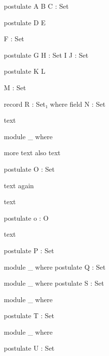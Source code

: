 \documentclass{article}
\begin{document}
\begin{code}
postulate
  A  B
      C : Set
\end{code}

\begin{code}
postulate
  D  E

      F : Set
\end{code}

\begin{code}
postulate
  G  H  : Set
  I
      J : Set
\end{code}

\begin{AgdaMultiCode}{2}
\begin{code}
postulate
  K  L
\end{code}
\begin{code}
      M : Set
\end{code}
\end{AgdaMultiCode}

\begin{code}
record R : Set₁ where
  field N :
            Set
\end{code}


\begin{AgdaAlign}
text \begin{code}        
module _ where
\end{code} more text
    also text  \begin{code}
    postulate O : Set  
  \end{code} text again

 text          \begin{code}            
    postulate o : O    
  \end{code}   text             
\end{AgdaAlign}

\begin{code}
postulate
 P : Set
\end{code}

\begin{code}
module _ where
 postulate
  Q : Set
\end{code}

\begin{code}
module _ where
         postulate
          S : Set
\end{code}

\begin{AgdaMultiCode}{1}
\begin{code}
module _ where
\end{code}
\begin{code}
  postulate T : Set
\end{code}
\end{AgdaMultiCode}

\begin{AgdaSuppressSpace}{1}
\begin{code}
module _ where
\end{code}
\begin{code}
  postulate U : Set
\end{code}
\end{AgdaSuppressSpace}
\end{document}
